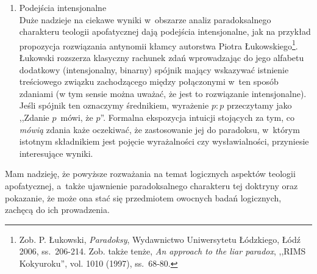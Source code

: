 \begin{enumerate}[label = \arabic*), itemindent=6mm, labelwidth=4mm, labelsep=2mm, itemsep=1em, leftmargin=0mm]
\item Podejścia intensjonalne\\
Duże nadzieje na ciekawe wyniki w~obszarze analiz paradoksalnego charakteru teologii apofatycznej dają podejścia intensjonalne, jak na przykład propozycja rozwiązania antynomii kłamcy autorstwa Piotra Łukowskiego\footnote{Zob. P. Łukowski, \textit{Paradoksy}, Wydawnictwo Uniwersytetu Łódzkiego, Łódź 2006, ss.~206-214. Zob. także tenże, \textit{An approach to the liar paradox}, ,,RIMS Kokyuroku'', vol. 1010 (1997), ss.~68-80.}. Łukowski rozszerza klasyczny rachunek zdań wprowadzając do jego alfabetu dodatkowy (intensjonalny, binarny) spójnik mający wskazywać istnienie treściowego związku zachodzącego między połączonymi w~ten sposób zdaniami (w tym sensie można uważać, że jest to rozwiązanie intensjonalne). Jeśli spójnik ten oznaczymy średnikiem, wyrażenie $p:p$ przeczytamy jako ,,Zdanie $p$~mówi, że $p$''. Formalna ekspozycja intuicji stojących za tym, co \textit{mówią} zdania każe oczekiwać, że zastosowanie jej do paradoksu, w~którym istotnym składnikiem jest pojęcie wyrażalności czy wysławialności, przyniesie interesujące wyniki.
\end{enumerate}

Mam nadzieję, że powyższe rozważania na temat logicznych aspektów teologii apofatycznej, a~także ujawnienie paradoksalnego charakteru tej doktryny oraz pokazanie, że może ona stać się przedmiotem owocnych badań logicznych, zachęcą do ich prowadzenia.


